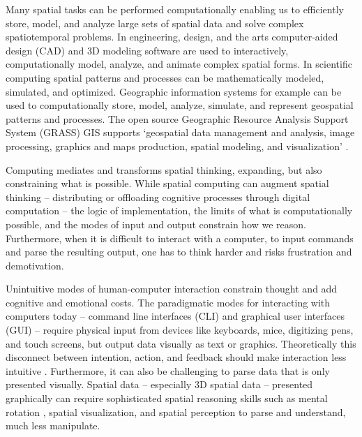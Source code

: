 \documentclass[prodmode,acmtochi]{acmsmall} %
\begin{document}

Many spatial tasks can be performed computationally 
enabling us to efficiently store, model, and analyze large sets of spatial data 
and solve complex spatiotemporal problems.
%
In engineering, design, and the arts 
computer-aided design (CAD) and 3D modeling software are used to interactively, computationally model, analyze, and animate complex spatial forms. 
%
In scientific computing spatial patterns and processes can be mathematically modeled, simulated, and optimized. 
%
Geographic information systems for example can be used to computationally store, model, analyze, simulate, and represent geospatial patterns and processes. 
%
The open source 
Geographic Resource Analysis Support System (GRASS) GIS supports 
`geospatial data management and analysis, image processing, graphics and maps production, spatial modeling, and visualization' \cite{GRASS}. 

Computing mediates and transforms spatial thinking, expanding, but also constraining what is possible.
%
While spatial computing can augment spatial thinking 
-- distributing or offloading cognitive processes through digital computation -- 
the logic of implementation,
the limits of what is computationally possible, 
and the modes of input and output
constrain how we reason. %
%
Furthermore, 
when it is difficult to interact with a computer, 
to input commands and parse the resulting output, 
one has to think harder and risks frustration and demotivation. %

Unintuitive modes of human-computer interaction constrain thought and add cognitive and emotional costs. 
%
The paradigmatic modes for interacting with computers today 
-- command line interfaces (CLI) and
graphical user interfaces (GUI)
 -- 
require physical input from devices like keyboards, mice, digitizing pens, and touch screens, but
output %
data visually as text or graphics. 
%
Theoretically this disconnect between intention, action, and feedback should make interaction less intuitive \cite{Dourish2001,Ishii2008}. 
%
Furthermore, it can also be challenging to parse data that is only presented visually. 
Spatial data -- especially 3D spatial data -- presented graphically can require sophisticated spatial reasoning skills such as mental rotation \cite{Shepard1971}, spatial visualization, and spatial perception \cite{Linn1985} to parse and understand, much less manipulate. 
\end{document}
